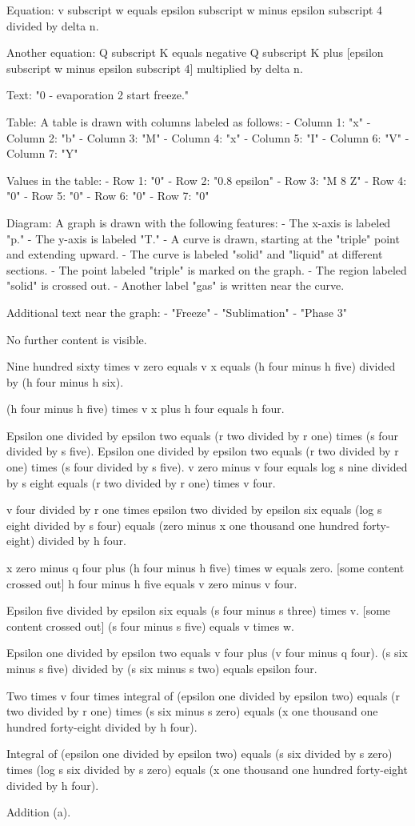 Equation:  
v subscript w equals epsilon subscript w minus epsilon subscript 4 divided by delta n.

Another equation:  
Q subscript K equals negative Q subscript K plus [epsilon subscript w minus epsilon subscript 4] multiplied by delta n.

Text:  
"0 - evaporation 2 start freeze."

Table:  
A table is drawn with columns labeled as follows:  
- Column 1: "x"  
- Column 2: "b"  
- Column 3: "M"  
- Column 4: "x"  
- Column 5: "I"  
- Column 6: "V"  
- Column 7: "Y"  

Values in the table:  
- Row 1: "0"  
- Row 2: "0.8 epsilon"  
- Row 3: "M 8 Z"  
- Row 4: "0"  
- Row 5: "0"  
- Row 6: "0"  
- Row 7: "0"  

Diagram:  
A graph is drawn with the following features:  
- The x-axis is labeled "p."  
- The y-axis is labeled "T."  
- A curve is drawn, starting at the "triple" point and extending upward.  
- The curve is labeled "solid" and "liquid" at different sections.  
- The point labeled "triple" is marked on the graph.  
- The region labeled "solid" is crossed out.  
- Another label "gas" is written near the curve.  

Additional text near the graph:  
- "Freeze"  
- "Sublimation"  
- "Phase 3"  

No further content is visible.

Nine hundred sixty times v zero equals v x equals (h four minus h five) divided by (h four minus h six).

(h four minus h five) times v x plus h four equals h four.

Epsilon one divided by epsilon two equals (r two divided by r one) times (s four divided by s five).  
Epsilon one divided by epsilon two equals (r two divided by r one) times (s four divided by s five).  
v zero minus v four equals log s nine divided by s eight equals (r two divided by r one) times v four.

v four divided by r one times epsilon two divided by epsilon six equals (log s eight divided by s four) equals (zero minus x one thousand one hundred forty-eight) divided by h four.

x zero minus q four plus (h four minus h five) times w equals zero.  
[some content crossed out]  
h four minus h five equals v zero minus v four.

Epsilon five divided by epsilon six equals (s four minus s three) times v.  
[some content crossed out]  
(s four minus s five) equals v times w.

Epsilon one divided by epsilon two equals v four plus (v four minus q four).  
(s six minus s five) divided by (s six minus s two) equals epsilon four.

Two times v four times integral of (epsilon one divided by epsilon two) equals (r two divided by r one) times (s six minus s zero) equals (x one thousand one hundred forty-eight divided by h four).

Integral of (epsilon one divided by epsilon two) equals (s six divided by s zero) times (log s six divided by s zero) equals (x one thousand one hundred forty-eight divided by h four).

Addition (a).